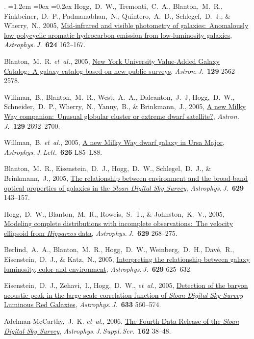 \documentclass[10pt,letterpaper]{article}
\newcommand{\foreign}[1]{\textsl{#1}}
\newcommand{\etal}{\foreign{et~al.}}
\newcommand{\project}[1]{\textsl{#1}}
\newcommand{\doi}[2]{\href{http://dx.doi.org/#1}{{#2}}}
\newcommand{\deemph}[1]{\textcolor{grey}{\footnotesize{#1}}}
\newcommand{\pubnumber}[1]{\deemph{{#1}.}}
\newcounter{refpubnum}
\newcommand{\hogglist}{%
    \rightmargin=0in
    \leftmargin=1.2em
    \topsep=0ex
    \partopsep=0pt
    \itemsep=0.2ex
    \parsep=0pt
    \itemindent=-1.0\leftmargin
    \listparindent=0.0\leftmargin
    \settowidth{\labelsep}{~}
    \usecounter{refpubnum}
  }
\begin{document}
\begin{list}{\pubnumber{\therefpubnum}}{\hogglist}
Hogg,~D.~W., Tremonti,~C.~A., Blanton,~M.~R., Finkbeiner,~D.~P., Padmanabhan,~N., Quintero,~A.~D., Schlegel,~D.~J., \& Wherry,~N., 2005,
\doi{10.1086/429686}{Mid-infrared and visible photometry of galaxies:\ Anomalously low polycyclic aromatic hydrocarbon emission from low-luminosity galaxies},
\textit{Astrophys.\,J.}\ \textbf{624} 162--167.
\item
Blanton,~M.~R. \etal, 2005,
\doi{10.1086/429803}{New York University Value-Added Galaxy Catalog:\ A galaxy catalog based on new public surveys},
\textit{Astron.\,J.}\ \textbf{129} 2562--2578.
\item
Willman,~B., Blanton,~M.~R., West,~A.~A., Dalcanton,~J.~J, Hogg,~D.~W., Schneider,~D.~P., Wherry,~N., Yanny,~B., \& Brinkmann,~J., 2005,
\doi{10.1086/430214}{A new Milky Way companion:\ Unusual globular cluster or extreme dwarf satellite?},
\textit{Astron.\,J.}\ \textbf{129} 2692--2700.
\item\label{pub:Willman2005b}
Willman,~B. \etal, 2005,
\doi{10.1086/431760}{A new Milky Way dwarf galaxy in Ursa Major},
\textit{Astrophys.\,J.\,Lett.}\ \textbf{626} L85--L88.
\item
Blanton,~M.~R., Eisenstein,~D.~J., Hogg,~D.~W., Schlegel,~D.~J., \& Brinkmann,~J., 2005,
\doi{10.1086/422897}{The relationship between environment and the broad-band optical properties of galaxies in the \project{Sloan Digital Sky Survey}},
\textit{Astrophys.\,J.}\ \textbf{629} 143--157.
\item
Hogg,~D.~W., Blanton,~M.~R., Roweis,~S.~T., \& Johnston,~K.~V., 2005,
\doi{10.1086/431572}{Modeling complete distributions with incomplete observations:\ The velocity ellipsoid from \project{Hipparcos} data},
\textit{Astrophys.\,J.}\ \textbf{629} 268--275.
\item
Berlind,~A.~A., Blanton,~M.~R., Hogg,~D.~W., Weinberg,~D.~H., Dav\'e,~R., Eisenstein,~D.~J., \& Katz,~N., 2005,
\doi{10.1086/431658}{Interpreting the relationship between galaxy luminosity, color and environment},
\textit{Astrophys.\,J.}\ \textbf{629} 625--632.
\item\label{pub:Eisenstein2005}
Eisenstein,~D.~J., Zehavi,~I., Hogg,~D.~W., \etal, 2005,
\doi{10.1086/466512}{Detection of the baryon acoustic peak in the large-scale correlation function of \project{Sloan Digital Sky Survey} Luminous Red Galaxies},
\textit{Astrophys.\,J.}\ \textbf{633} 560--574.
\item
Adelman-McCarthy,~J.~K. \etal, 2006,
\doi{10.1086/497917}{The Fourth Data Release of the \project{Sloan Digital Sky Survey}},
\textit{Astrophys.\,J.\,Suppl.\,Ser.}\ \textbf{162} 38--48.

\end{list}
\end{document}
